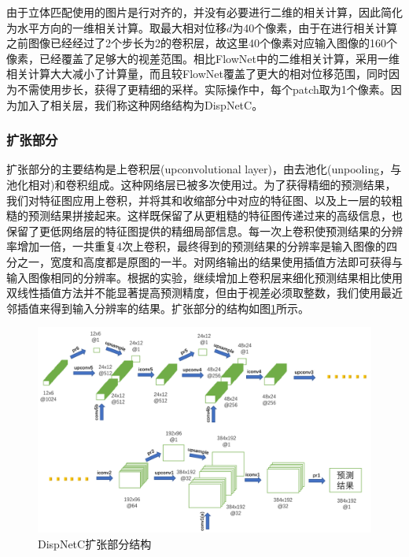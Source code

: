 由于立体匹配使用的图片是行对齐的，并没有必要进行二维的相关计算，因此简化为水平方向的一维相关计算。取最大相对位移$d$为40个像素，由于在进行相关计算之前图像已经经过了2个步长为2的卷积层，故这里40个像素对应输入图像的160个像素，已经覆盖了足够大的视差范围。相比FlowNet中的二维相关计算，采用一维相关计算大大减小了计算量，而且较FlowNet覆盖了更大的相对位移范围，同时因为不需使用步长，获得了更精细的采样。实际操作中，每个patch取为1个像素。因为加入了相关层，我们称这种网络结构为DispNetC。

\subsubsection{扩张部分}
扩张部分的主要结构是上卷积层(upconvolutional layer)，由去池化(unpooling，与池化相对)和卷积组成。这种网络层已被多次使用过\cite{zeiler2011adaptive, zeiler2014visualizing, goodfellow2014generative}。为了获得精细的预测结果，我们对特征图应用上卷积，并将其和收缩部分中对应的特征图、以及上一层的较粗糙的预测结果拼接起来。这样既保留了从更粗糙的特征图传递过来的高级信息，也保留了更低网络层的特征图提供的精细局部信息。每一次上卷积使预测结果的分辨率增加一倍，一共重复4次上卷积，最终得到的预测结果的分辨率是输入图像的四分之一，宽度和高度都是原图的一半。对网络输出的结果使用插值方法即可获得与输入图像相同的分辨率。根据\cite{dosovitskiy2015flownet}的实验，继续增加上卷积层来细化预测结果相比使用双线性插值方法并不能显著提高预测精度，但由于视差必须取整数，我们使用最近邻插值来得到输入分辨率的结果。扩张部分的结构如图\ref{fig:4_1_DispNet_expanding_part}所示。

\begin{figure}[!htb]
	\centering\includegraphics[width=6in]{figures/4_1_dispnet_expanding_part.png}
	\caption{DispNetC扩张部分结构}\label{fig:4_1_DispNet_expanding_part}
\end{figure}

